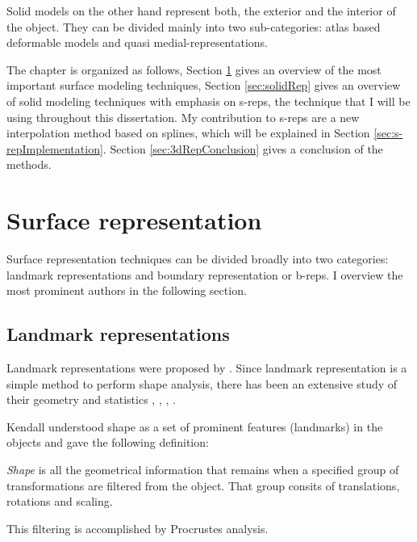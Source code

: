 Solid models on the other hand represent both, the exterior and the interior of the object. 
They can be divided mainly into two sub-categories: atlas based deformable models and quasi medial-representations. 

The chapter is organized as follows, Section \ref{sec:surfaceRep} gives an overview of the most important surface modeling
techniques, Section \ref{sec:solidRep} gives an overview of solid modeling techniques with emphasis on s-reps, 
the technique that I will be using throughout this dissertation. 
My contribution to s-reps are a new interpolation method based on splines, which will be explained 
in Section \ref{sec:s-repImplementation}.
Section \ref{sec:3dRepConclusion} gives a conclusion of the methods.


\section{Surface representation}
\label{sec:surfaceRep}


Surface representation techniques can be divided 
broadly into two categories: landmark representations and boundary representation or b-reps. 
I overview the most prominent authors in the following section.


\subsection{Landmark representations}

Landmark representations were proposed by \cite{kendall1989survey}. 
Since landmark representation is a simple method to perform shape analysis,
there has been an extensive study of their geometry and statistics \cite{bookstein1991morphometric}, \cite{dryden1993multivariate}, \cite{james1993revolution}, \cite{small1996statistical}.

Kendall understood shape as a set of prominent features (landmarks) in the objects and gave the following definition: 

\begin{definition}
 \label{def:shape}
 \textit{Shape} is all the geometrical information that remains when
 a specified group of transformations are filtered from the object. That group consits of translations, rotations and scaling.
\end{definition}
 
This filtering is accomplished by Procrustes analysis. 

